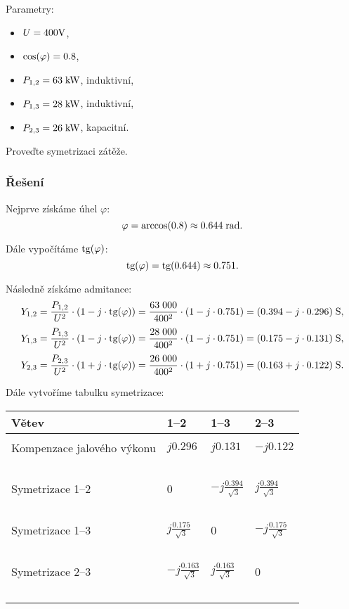 \documentclass{article}
\begin{document}
Parametry:
\begin{itemize}
    \item $U = 400 \textrm{V}$,
    \item $\textrm{cos} (\varphi) = 0.8$,
    \item $P_{1,2} = 63 \; \textrm{kW}$, induktivní,
    \item $P_{1,3} = 28 \; \textrm{kW}$, induktivní,
    \item $P_{2,3} = 26 \; \textrm{kW}$, kapacitní.
\end{itemize}

Proveďte symetrizaci zátěže.

\subsubsection{Řešení}
Nejprve získáme úhel $\varphi$:
$$
    \varphi = \textrm{arccos} (0.8) \approx 0.644 \; \textrm{rad}.
$$

Dále vypočítáme $\textrm{tg} (\varphi)$:
$$
    \textrm{tg} (\varphi) = \textrm{tg} (0.644) \approx 0.751.
$$

Následně získáme admitance:
$$
    Y_{1,2} = \frac{P_{1,2}}{U^2} \cdot (1 - j \cdot \textrm{tg} (\varphi)) = \frac{63 \; 000}{400^2} \cdot (1 - j \cdot 0.751) = (0.394 - j \cdot 0.296) \; \textrm{S},
$$
$$
    Y_{1,3} = \frac{P_{1,3}}{U^2} \cdot (1 - j \cdot \textrm{tg} (\varphi)) = \frac{28 \; 000}{400^2} \cdot (1 - j \cdot 0.751) = (0.175 - j \cdot 0.131) \; \textrm{S},
$$
$$
    Y_{2,3} = \frac{P_{2,3}}{U^2} \cdot (1 + j \cdot \textrm{tg} (\varphi)) = \frac{26 \; 000}{400^2} \cdot (1 + j \cdot 0.751) = (0.163 + j \cdot 0.122) \; \textrm{S}.
$$

Dále vytvoříme tabulku symetrizace:

\begin{center}
    \begin{tabular}{l l l l}
        \hline
        Větev                      & 1--2                        & 1--3                        & 2--3                        \\
        \hline                                                                                                               \\
        Kompenzace jalového výkonu & $j 0.296$                   & $j 0.131$                   & $-j 0.122$                  \\~\\
        Symetrizace 1--2           & 0                           & $-j \frac{0.394}{\sqrt{3}}$ & $j \frac{0.394}{\sqrt{3}}$  \\~\\
        Symetrizace 1--3           & $j \frac{0.175}{\sqrt{3}}$  & 0                           & $-j \frac{0.175}{\sqrt{3}}$ \\~\\
        Symetrizace 2--3           & $-j \frac{0.163}{\sqrt{3}}$ & $j \frac{0.163}{\sqrt{3}}$  & 0                           \\~\\
        \hline
    \end{tabular}
\end{center}
\end{document}

